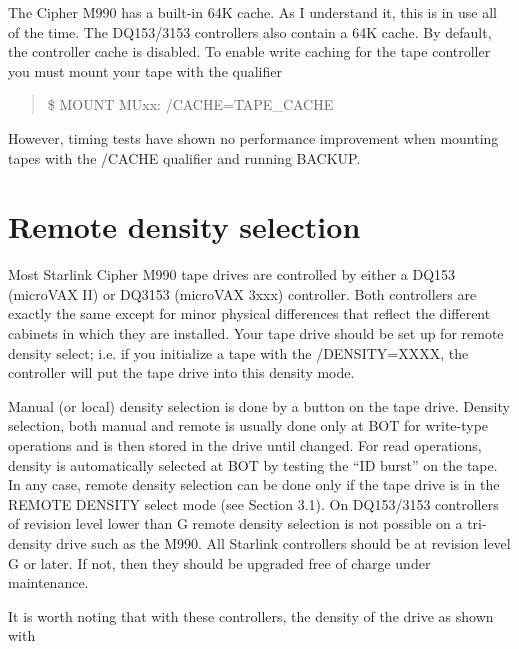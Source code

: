 The Cipher M990 has a built-in 64K cache. As I understand it, this is in use
all of the time. The DQ153/3153 controllers also contain a 64K cache. By
default, the controller cache is disabled. To enable write caching for the tape
controller you must mount your tape with the qualifier

\begin{quote}

\$ MOUNT MUxx: /CACHE=TAPE\_CACHE

\end{quote}


However, timing tests have shown no performance improvement when mounting tapes
with the /CACHE qualifier and running BACKUP.

\section{Remote density selection}

Most Starlink Cipher M990 tape drives are controlled by either a DQ153
(microVAX II) or DQ3153 (microVAX 3xxx) controller. Both controllers are
exactly the same except for minor physical differences that reflect the
different cabinets in which they are installed. Your tape drive should be set up
for remote density select; i.e. if you initialize a tape with the /DENSITY=XXXX,
the controller will put the tape drive into this  density mode. 

Manual (or local) density selection is done by a button
on the tape drive. Density selection, both manual and remote is
usually done only at BOT for write-type operations and is then stored in the
drive until changed. For read operations, density is automatically selected at
BOT by testing the ``ID burst'' on the tape. 
In any case, remote density selection can be
done only if the tape drive is in the REMOTE DENSITY  select mode (see Section
3.1). On
DQ153/3153 controllers of revision level lower than G remote density
selection is not possible on a tri-density drive such as the M990. All Starlink
controllers should be at revision level G or later. If not, then they should be
upgraded free of charge under maintenance.

It is worth noting that with these controllers, the density of the drive as
shown with 

